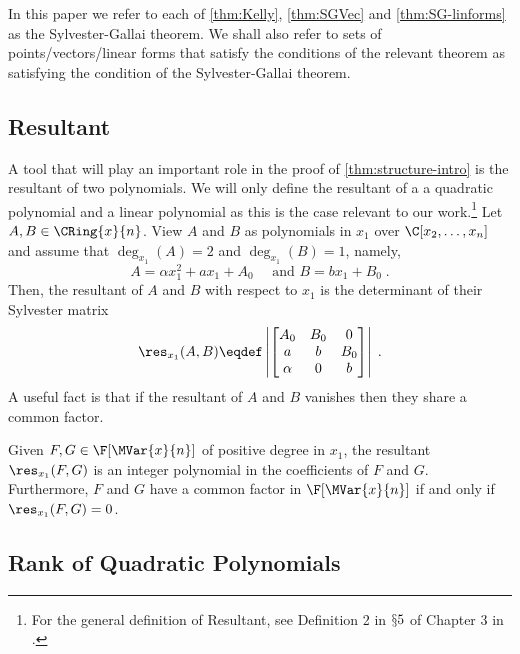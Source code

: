 In this paper we refer to each of \autoref{thm:Kelly}, \autoref{thm:SGVec} and \autoref{thm:SG-linforms} as the Sylvester-Gallai theorem. We shall also refer to sets of points/vectors/linear forms that satisfy the conditions of the relevant theorem as satisfying the condition of the Sylvester-Gallai theorem.

\subsection{Resultant}\label{sec:res}



A tool that will play an important role in the proof of \autoref{thm:structure-intro} is the resultant of two polynomials. We will only define the resultant of a a quadratic polynomial and a linear polynomial as this is the case relevant to our work.\footnote{For the general definition of Resultant, see Definition 2 in $\mathsection 5$ of Chapter 3 in \cite{CLO}.} Let $A,B\in\CRing{x}{n}$. View $A$ and $B$ as polynomials in $x_1$ over $\C[x_2,\ldots,x_n]$ and assume that $\deg_{x_1}(A) = 2 $ and  $\deg_{x_1}(B) = 1 $, namely,
$$A = \alpha x_1^2 + ax_1 + A_0 \quad \text{ and } B =  b x_1 + B_0 \;.$$
Then, the resultant of $A$ and $B$ with respect to $x_1$ is the determinant of their Sylvester matrix
$$
\res_{x_1}(A,B) \eqdef 
\left| \begin{bmatrix} A_0 & B_0 & 0 \\
a & b & B_0 \\
\alpha & 0 & b \\

\end{bmatrix}\right| \;.
$$
A useful fact is that if the resultant of $A$ and $B$ vanishes then they share a common factor. 

\begin{theorem}\label{thm:res}
Given $F,G\in\F[\MVar{x}{n}]$ of positive degree in $x_1$, the resultant $\res_{x_1}(F,G)$ is an integer polynomial in the coefficients of $F$ and $G$. Furthermore, $F$ and $G$ have a common factor in $\F[\MVar{x}{n}]$ if and only if $\res_{x_1}(F,G) = 0$.
\end{theorem}


\subsection{Rank of Quadratic Polynomials}\label{sec:rank}
 












